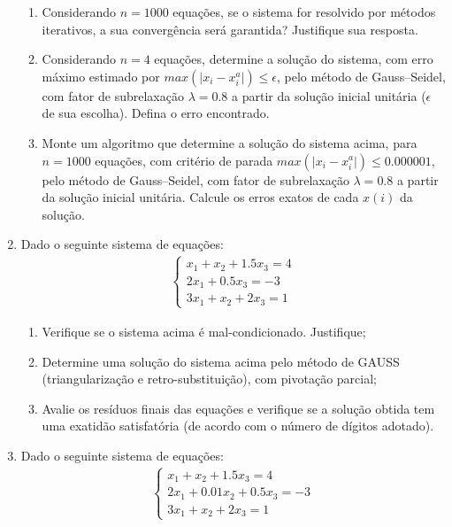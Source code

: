 \documentclass[12pt]{article}
\newenvironment{smallitem}{
    \vspace{-2mm}
    \begin{enumerate}
    \setlength{\parskip}{0pt}
    \setlength{\itemsep}{2pt}
}{
    \vspace{-2mm}
    \end{enumerate}
}
\begin{document}
\begin{enumerate}[label=\textbf{\arabic*})]
\begin{smallitem}

\item Considerando $n = 1000$ equações, se o sistema for resolvido por métodos
iterativos, a sua convergência será garantida? Justifique sua resposta.

\item Considerando $n = 4$ equações, determine a solução do sistema, com erro
máximo estimado por $max(\vert x_i - x_i^a \vert) \leq \epsilon$, pelo método
de Gauss--Seidel, com fator de subrelaxação $\lambda = 0.8$ a partir da
solução inicial unitária ($\epsilon$ de sua escolha). Defina o erro
encontrado.

\item Monte um algoritmo que determine a solução do sistema acima, para $n =
1000$ equações, com critério de parada $max(\vert x_i - x_i^a \vert) \leq
0.000001$, pelo método de Gauss--Seidel, com fator de subrelaxação $\lambda =
0.8$ a partir da solução inicial unitária. Calcule os erros exatos de cada
$x(i)$ da solução.

\end{smallitem}

\item Dado o seguinte sistema de equações:
\begin{align*}
\begin{cases}
x_1 + x_2 + 1.5x_3 = 4 \\
2x_1 + 0.5x_3 = -3 \\
3x_1 + x_2 + 2x_3 = 1
\end{cases}
\end{align*}

\begin{smallitem}

\item Verifique se o sistema acima é mal-condicionado. Justifique;

\item Determine uma solução do sistema acima pelo método de GAUSS
(triangularização e retro-substituição), com pivotação parcial;

\item Avalie os resíduos finais das equações e verifique se a solução obtida
tem uma exatidão satisfatória (de acordo com o número de dígitos adotado).

\end{smallitem}

\item Dado o seguinte sistema de equações:
\begin{align*}
\begin{cases}
x_1 + x_2 + 1.5x_3 = 4 \\
2x_1 + 0.01x_2 + 0.5x_3 = -3 \\
3x_1 + x_2 + 2x_3 = 1
\end{cases}
\end{align*}


\end{enumerate}
\end{document}
